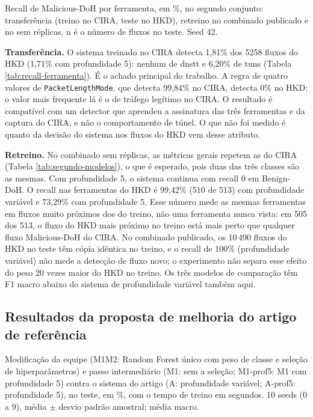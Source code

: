 \documentclass[conference]{IEEEtran}
\newcommand{\tabelacoluna}[1]{{\footnotesize\setlength{\tabcolsep}{3pt}%
  \begin{adjustbox}{max width=\columnwidth}\end{adjustbox}}}
\newcommand{\tabelapagina}[1]{{\footnotesize\setlength{\tabcolsep}{3pt}%
  \begin{adjustbox}{max width=\textwidth}\end{adjustbox}}}
\begin{document}
\begin{table}[!t]
\centering
\caption{Recall de Malicious-DoH por ferramenta, em \%, no segundo conjunto: transferência (treino no CIRA, teste no HKD), retreino no combinado publicado e no sem réplicas. n é o número de fluxos no teste. Seed 42.}
\label{tab:recall-ferramenta}
\tabelacoluna{segundo_recall_ferramenta}
\end{table}

\textbf{Transferência.} O sistema treinado no CIRA detecta 1,81\% dos 5258 fluxos do HKD (1,71\% com profundidade 5): nenhum de dnstt e 6,20\% de tuns (Tabela \ref{tab:recall-ferramenta}). É o achado principal do trabalho. A regra de quatro valores de \texttt{PacketLengthMode}, que detecta 99,84\% no CIRA, detecta 0\% no HKD: o valor mais frequente lá é o de tráfego legítimo no CIRA. O resultado é compatível com um detector que aprendeu a assinatura das três ferramentas e da captura do CIRA, e não o comportamento de túnel. O que não foi medido é quanto da decisão do sistema nos fluxos do HKD vem desse atributo.

\textbf{Retreino.} No combinado sem réplicas, as métricas gerais repetem as do CIRA (Tabela \ref{tab:segundo-modelos}), o que é esperado, pois duas das três classes são as mesmas. Com profundidade 5, o sistema continua com recall 0 em Benign-DoH. O recall nas ferramentas do HKD é 99,42\% (510 de 513) com profundidade variável e 73,29\% com profundidade 5. Esse número mede as mesmas ferramentas em fluxos muito próximos dos do treino, não uma ferramenta nunca vista: em 505 dos 513, o fluxo do HKD mais próximo no treino está mais perto que qualquer fluxo Malicious-DoH do CIRA. No combinado publicado, os 10\,490 fluxos do HKD no teste têm cópia idêntica no treino, e o recall de 100\% (profundidade variável) não mede a detecção de fluxo novo; o experimento não separa esse efeito do peso 20 vezes maior do HKD no treino. Os três modelos de comparação têm F1 macro abaixo do sistema de profundidade variável também aqui.

\subsection{Resultados da proposta de melhoria do artigo de referência}

\begin{table}[!t]
\centering
\caption{Modificação da equipe (M1M2: Random Forest único com peso de classe e seleção de hiperparâmetros) e passo intermediário (M1: sem a seleção; M1-prof5: M1 com profundidade 5) contra o sistema do artigo (A: profundidade variável; A-prof5: profundidade 5), no teste, em \%, com o tempo de treino em segundos. 10 seeds (0 a 9), média $\pm$ desvio padrão amostral; média macro.}
\label{tab:modificacao}
\tabelapagina{modificacao_metricas_dupla}
\end{table}
\end{document}
